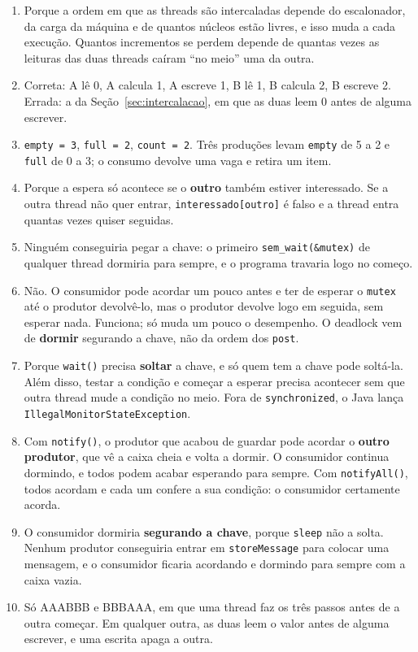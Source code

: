 \documentclass[11pt,a4paper]{article}
\newcommand{\cmd}[1]{\texttt{#1}}
\begin{document}
\begin{enumerate}
    \item Porque a ordem em que as threads são intercaladas depende do escalonador, da carga da máquina e de quantos núcleos estão livres, e isso muda a cada execução. Quantos incrementos se perdem depende de quantas vezes as leituras das duas threads caíram ``no meio'' uma da outra.
    \item Correta: A lê 0, A calcula 1, A escreve 1, B lê 1, B calcula 2, B escreve 2. Errada: a da Seção~\ref{sec:intercalacao}, em que as duas leem 0 antes de alguma escrever.
    \item \cmd{empty = 3}, \cmd{full = 2}, \cmd{count = 2}. Três produções levam \cmd{empty} de 5 a 2 e \cmd{full} de 0 a 3; o consumo devolve uma vaga e retira um item.
    \item Porque a espera só acontece se o \textbf{outro} também estiver interessado. Se a outra thread não quer entrar, \cmd{interessado[outro]} é falso e a thread entra quantas vezes quiser seguidas.
    \item Ninguém conseguiria pegar a chave: o primeiro \cmd{sem\_wait(\&mutex)} de qualquer thread dormiria para sempre, e o programa travaria logo no começo.
    \item Não. O consumidor pode acordar um pouco antes e ter de esperar o \cmd{mutex} até o produtor devolvê-lo, mas o produtor devolve logo em seguida, sem esperar nada. Funciona; só muda um pouco o desempenho. O deadlock vem de \textbf{dormir} segurando a chave, não da ordem dos \cmd{post}.
    \item Porque \cmd{wait()} precisa \textbf{soltar} a chave, e só quem tem a chave pode soltá-la. Além disso, testar a condição e começar a esperar precisa acontecer sem que outra thread mude a condição no meio. Fora de \cmd{synchronized}, o Java lança \cmd{IllegalMonitorStateException}.
    \item Com \cmd{notify()}, o produtor que acabou de guardar pode acordar o \textbf{outro produtor}, que vê a caixa cheia e volta a dormir. O consumidor continua dormindo, e todos podem acabar esperando para sempre. Com \cmd{notifyAll()}, todos acordam e cada um confere a sua condição: o consumidor certamente acorda.
    \item O consumidor dormiria \textbf{segurando a chave}, porque \cmd{sleep} não a solta. Nenhum produtor conseguiria entrar em \cmd{storeMessage} para colocar uma mensagem, e o consumidor ficaria acordando e dormindo para sempre com a caixa vazia.
    \item Só AAABBB e BBBAAA, em que uma thread faz os três passos antes de a outra começar. Em qualquer outra, as duas leem o valor antes de alguma escrever, e uma escrita apaga a outra.

\end{enumerate}
\end{document}
